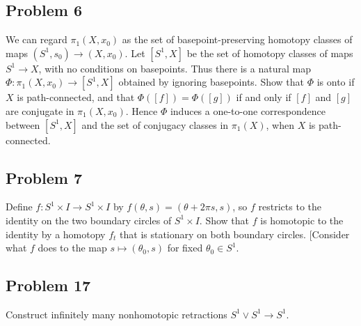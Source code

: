 \subsection{Problem 6}
\begin{prob}
    We can regard $\pi_1\left( X,x_0 \right) $ as the set of basepoint-preserving homotopy classes of maps $\left( S^{1},s_0 \right) \to \left( X,x_0 \right) $. Let $\left[ S^{1},X \right] $ be the set of homotopy classes of maps $S^{1}\to X$, with no conditions on basepoints. Thus there is a natural map $\Phi : \pi_1\left( X,x_0 \right) \to \left[ S^{1},X \right] $ obtained by ignoring basepoints. Show that $\Phi$ is onto if $X$ is path-connected, and that $\Phi([f]) = \Phi([g])$ if and only if $[f]$ and $[g]$ are conjugate in $\pi_1\left( X,x_0 \right) $. Hence $\Phi$ induces a one-to-one correspondence between $\left[ S^{1},X \right] $ and the set of conjugacy classes in $\pi_1\left( X \right) $, when $X$ is path-connected. 
\end{prob}

\subsection{Problem 7}
\begin{prob}
    Define $ f \colon S^{1}\times I\to S^{1}\times I$ by $f(\theta, s)=(\theta + 2\pi s,s)$, so $f$ restricts to the identity on the two boundary circles of $S^{1}\times I$. Show that $f$ is homotopic to the identity by a homotopy $f_t$ that is stationary on both boundary circles. [Consider what $f$ does to the map $s \mapsto (\theta_0,s)$ for fixed $\theta_0\in S^{1}$. 
\end{prob}

\subsection{Problem 17}
\begin{prob}
    Construct infinitely many nonhomotopic retractions $S^{1} \vee S^{1} \to S^{1} $.
\end{prob}





